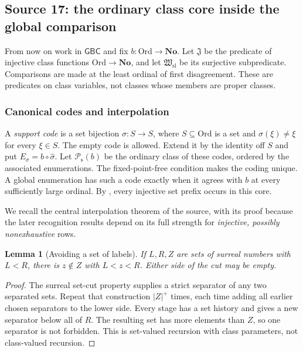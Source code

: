 \documentclass[11pt]{article}
\newtheorem{lemma}[lemma]{Lemma}
\theoremstyle{definition}
\theoremstyle{remark}
\newcommand{\No}{\mathbf{No}}
\newcommand{\Ord}{\mathrm{Ord}}
\newcommand{\Hsl}{\mathfrak W_{\mathrm{sl}}}
\newcommand{\Jinj}{\mathfrak J}
\newcommand{\Psupp}{\mathcal P_{\mathrm{s}}}
\newcommand{\GBC}{\mathsf{GBC}}
\begin{document}
\subsection{Source 17: the ordinary class core inside the global comparison}
\label{swo:gs:sec:core}

From now on work in $\GBC$ and fix $b:\Ord\to\No$. Let $\Jinj$ be the
predicate of injective class functions $\Ord\to\No$, and let $\Hsl$ be its
surjective subpredicate. Comparisons are made at the least ordinal of
first disagreement. These are predicates on class variables, not classes
whose members are proper classes.

\subsubsection{Canonical codes and interpolation}
A \emph{support code} is a set bijection $\sigma:S\to S$, where
$S\subseteq\Ord$ is a set and $\sigma(\xi)\ne\xi$ for every $\xi\in S$.
The empty code is allowed. Extend it by the identity off $S$ and put
$E_\sigma=b\circ\widehat\sigma$. Let $\Psupp(b)$ be the ordinary class of
these codes, ordered by the associated enumerations. The fixed-point-free
condition makes the coding unique. A global enumeration has such a code
exactly when it agrees with $b$ at every sufficiently large ordinal.
By , every injective set prefix occurs
in this core.

We recall the central interpolation theorem of the source, with its proof
because the later recognition results depend on its full strength for
\emph{injective, possibly nonexhaustive} rows.

\begin{lemma}[Avoiding a set of labels]\label{swo:gs:lem:avoid-set}
If $L,R,Z$ are sets of surreal numbers with $L<R$, there is
$z\notin Z$ with $L<z<R$. Either side of the cut may be empty.
\end{lemma}
\begin{proof}
The surreal set-cut property supplies a strict separator of any two
separated sets. Repeat that construction $|Z|^+$ times, each time adding
all earlier chosen separators to the lower side. Every stage has a set
history and gives a new separator below all of $R$. The resulting set
has more elements than $Z$, so one separator is not forbidden. This is
set-valued recursion with class parameters, not class-valued recursion.
\end{proof}
\end{document}
